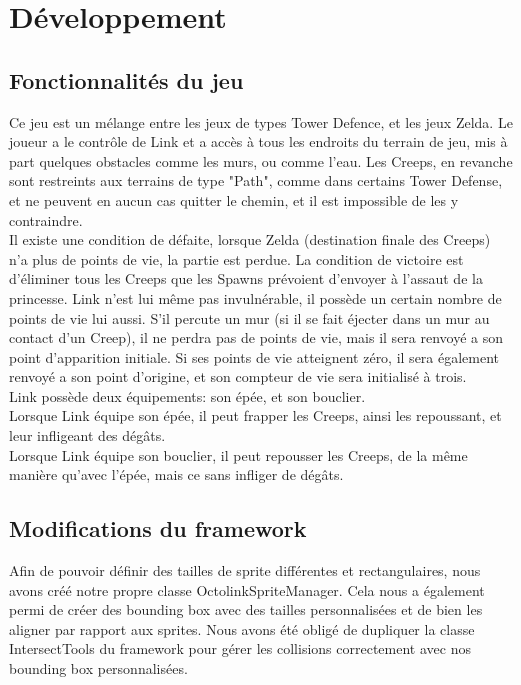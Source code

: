 \chapter{Développement}

\section{Fonctionnalités du jeu}

Ce jeu est un mélange entre les jeux de types Tower Defence, et les jeux Zelda. Le joueur a le contrôle de Link et a accès à tous les endroits du terrain de jeu, mis à part quelques obstacles comme les murs, ou comme l'eau.
Les Creeps, en revanche sont restreints aux terrains de type "Path", comme dans certains Tower Defense, et ne peuvent en aucun cas quitter le chemin, et il est impossible de les y contraindre.\\
Il existe une condition de défaite, lorsque Zelda (destination finale des Creeps) n'a plus de points de vie, la partie est perdue.
La condition de victoire est d'éliminer tous les Creeps que les Spawns prévoient d'envoyer à l'assaut de la princesse.
Link n'est lui même pas invulnérable, il possède un certain nombre de points de vie lui aussi. S'il percute un mur (si il se fait éjecter dans un mur au contact d'un Creep), il ne perdra pas de points de vie, mais il sera renvoyé a son point d'apparition initiale.
Si ses points de vie atteignent zéro, il sera également renvoyé a son point d'origine, et son compteur de vie sera initialisé à trois.\\
Link possède deux équipements: son épée, et son bouclier.\\
Lorsque Link équipe son épée, il peut frapper les Creeps, ainsi les repoussant, et leur infligeant des dégâts.\\
Lorsque Link équipe son bouclier, il peut repousser les Creeps, de la même manière qu'avec l'épée, mais ce sans infliger de dégâts.\\


\section{Modifications du framework}

Afin de pouvoir définir des tailles de sprite différentes et rectangulaires, nous avons créé notre propre classe OctolinkSpriteManager. Cela nous a également permi de créer des bounding box avec des tailles personnalisées et de bien les aligner par rapport aux sprites. Nous avons été obligé de dupliquer la classe IntersectTools du framework pour gérer les collisions correctement avec nos bounding box personnalisées.

